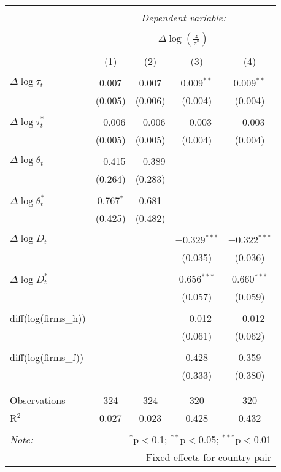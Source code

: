 
\begin{tabular}{@{\extracolsep{5pt}}lcccc} 
\\[-1.8ex]\hline 
\hline \\[-1.8ex] 
 & \multicolumn{4}{c}{\textit{Dependent variable:}} \\ 
\cline{2-5} 
\\[-1.8ex] & \multicolumn{4}{c}{$\Delta \log \left(\frac{z}{z^*} \right)$} \\ 
\\[-1.8ex] & (1) & (2) & (3) & (4)\\ 
\hline \\[-1.8ex] 
 $\Delta \log \tau_t$ & 0.007 & 0.007 & 0.009$^{**}$ & 0.009$^{**}$ \\ 
  & (0.005) & (0.006) & (0.004) & (0.004) \\ 
  & & & & \\ 
 $\Delta \log \tau_t^*$ & $-$0.006 & $-$0.006 & $-$0.003 & $-$0.003 \\ 
  & (0.005) & (0.005) & (0.004) & (0.004) \\ 
  & & & & \\ 
 $\Delta \log \theta_t$ & $-$0.415 & $-$0.389 &  &  \\ 
  & (0.264) & (0.283) &  &  \\ 
  & & & & \\ 
 $\Delta \log \theta_t^*$ & 0.767$^{*}$ & 0.681 &  &  \\ 
  & (0.425) & (0.482) &  &  \\ 
  & & & & \\ 
 $\Delta \log D_t$ &  &  & $-$0.329$^{***}$ & $-$0.322$^{***}$ \\ 
  &  &  & (0.035) & (0.036) \\ 
  & & & & \\ 
 $\Delta \log D_t^*$ &  &  & 0.656$^{***}$ & 0.660$^{***}$ \\ 
  &  &  & (0.057) & (0.059) \\ 
  & & & & \\ 
 diff(log(firms\_h)) &  &  & $-$0.012 & $-$0.012 \\ 
  &  &  & (0.061) & (0.062) \\ 
  & & & & \\ 
 diff(log(firms\_f)) &  &  & 0.428 & 0.359 \\ 
  &  &  & (0.333) & (0.380) \\ 
  & & & & \\ 
\hline \\[-1.8ex] 
Observations & 324 & 324 & 320 & 320 \\ 
R$^{2}$ & 0.027 & 0.023 & 0.428 & 0.432 \\ 
\hline 
\hline \\[-1.8ex] 
\textit{Note:}  & \multicolumn{4}{r}{$^{*}$p$<$0.1; $^{**}$p$<$0.05; $^{***}$p$<$0.01} \\ 
 & \multicolumn{4}{r}{Fixed effects for country pair} \\ 
\end{tabular} 
